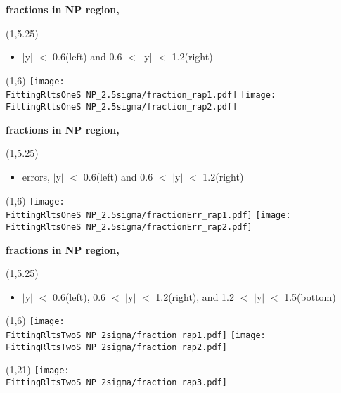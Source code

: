 \documentclass[11pt,slidescentered,red,compress,handout,hyperref={bookmarks=true},mathseriftable]{beamer}
\newcommand{\FittingRltsOneS}{../Psi1S/Fit/parameter/evaluateCtau/}
\newcommand{\FittingRltsTwoS}{../Psi2S/Fit/parameter/evaluateCtau/}
\begin{document}
\begin{frame}[t]{\small \bf fractions in NP region,  }{}
\begin{textblock}{48}(1,5.25)
\begin{itemize}
\scriptsize \item  $|$y$|$ $<$ 0.6(left) and 0.6 $<$ $|$y$|$ $<$ 1.2(right)
\end{itemize}
\end{textblock}
\begin{textblock}{48}(1,6)
\hspace*{10pt} \texttt{[image: \\FittingRltsOneS NP\_2.5sigma/fraction\_rap1.pdf]}
\hspace*{10pt} \texttt{[image: \\FittingRltsOneS NP\_2.5sigma/fraction\_rap2.pdf]}
\end{textblock}
\end{frame}

\begin{frame}[t]{\small \bf fractions in NP region,  }{}
\begin{textblock}{48}(1,5.25)
\begin{itemize}
\scriptsize \item  errors, $|$y$|$ $<$ 0.6(left) and 0.6 $<$ $|$y$|$ $<$ 1.2(right)
\end{itemize}
\end{textblock}
\begin{textblock}{48}(1,6)
\hspace*{10pt} \texttt{[image: \\FittingRltsOneS NP\_2.5sigma/fractionErr\_rap1.pdf]}
\hspace*{10pt} \texttt{[image: \\FittingRltsOneS NP\_2.5sigma/fractionErr\_rap2.pdf]}
\end{textblock}
\end{frame}

\begin{frame}[t]{\small \bf fractions in NP region,  }{}
\begin{textblock}{48}(1,5.25)
\begin{itemize}
\scriptsize \item  $|$y$|$ $<$ 0.6(left), 0.6 $<$ $|$y$|$ $<$ 1.2(right), and 1.2 $<$ $|$y$|$ $<$ 1.5(bottom)
\end{itemize}
\end{textblock}
\begin{textblock}{48}(1,6)
\hspace*{10pt} \texttt{[image: \\FittingRltsTwoS NP\_2sigma/fraction\_rap1.pdf]}
\hspace*{10pt} \texttt{[image: \\FittingRltsTwoS NP\_2sigma/fraction\_rap2.pdf]}
\begin{textblock}{48}(1,21)
\hspace*{10pt} \texttt{[image: \\FittingRltsTwoS NP\_2sigma/fraction\_rap3.pdf]}
\end{textblock}
\end{textblock}
\end{frame}
\end{document}
